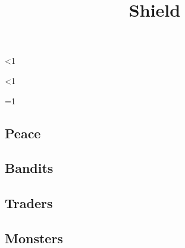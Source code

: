 \documentclass[a4paper,openany]{book}
\title{\Glsentrytext{gm} Shield}
\begin{document}


\newpage

\begin{multicols}{2}



\ifnum\value{temperature}<1
  \wolf
  \ghast
\else
  \chitincrawler

  \basilisk
\fi

\griffin

\ifnum\value{temperature}<1
  \dryad
\fi

\mouthdigger

\woodspy

\woodspy

\ifnum\value{temperature}=1
  \umberhulk
\fi

\end{multicols}

\begin{multicols}{2}

\ifcase\value{temperature}\relax%
\or
  \encColdVillages
  \encColdEdge
  \encColdForest
\or
  \encMildVillages
  \encMildEdge
  \encMildForest
\or
  \encWarmVillages
  \encWarmEdge
  \encWarmForest
\else
  \encMildVillages
  \encMildEdge
  \encMildForest
\fi

\subsection*{Peace}

\encPeace

\subsection*{Bandits}

\encBandits

\subsection*{Traders}

\encTraders

\subsection*{Monsters}

\encMonsters



\end{multicols}

\iftoggle{core}{
  \newpage
  \stackingDamageChart

  \begin{multicols}{2}

  \textbf{Mana Regeneration}

  \noindent
  \manaRegenChart

  \noindent
  \manaCoveringChart

  \larcenyChart
  \initiativechart

  \end{multicols}

  \chasechart
  \gatheringChart

}{}
\end{document}
